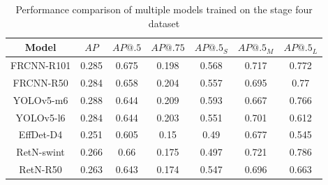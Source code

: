\begin{table}[H]
    \begin{tabular}{|c|c|c|c|c|c|c|}
        \hline
        Model      & $AP$  & $AP@.5$ & $AP@.75$ & $AP@.5_S$ & $AP@.5_M$ & $AP@.5_L$ \\ \hline
        FRCNN-R101 & 0.285 & 0.675   & 0.198    & 0.568     & 0.717     & 0.772     \\ \hline
        FRCNN-R50  & 0.284 & 0.658   & 0.204    & 0.557     & 0.695     & 0.77      \\ \hline
        YOLOv5-m6  & 0.288 & 0.644   & 0.209    & 0.593     & 0.667     & 0.766     \\ \hline
        YOLOv5-l6  & 0.284 & 0.644   & 0.203    & 0.551     & 0.701     & 0.612     \\ \hline
        EffDet-D4  & 0.251 & 0.605   & 0.15     & 0.49      & 0.677     & 0.545     \\ \hline
        RetN-swint & 0.266 & 0.66    & 0.175    & 0.497     & 0.721     & 0.786     \\ \hline
        RetN-R50   & 0.263 & 0.643   & 0.174    & 0.547     & 0.696     & 0.663     \\ \hline
    \end{tabular}
    \caption{Performance comparison of multiple models trained on the stage four dataset}
    \label{tab:model_results:stage_four}
\end{table}

